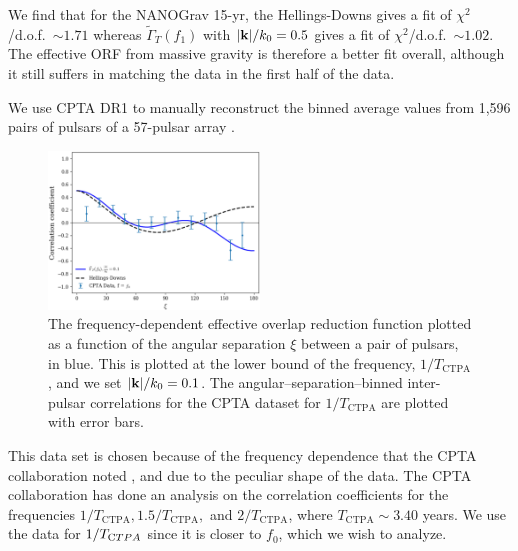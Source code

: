 \documentclass[prd,aps,psfig,nofootinbib,nobibnotes,superscriptaddress,preprintnumbers,times]{revtex4-2}\setlength{\topmargin}{-14mm}
\begin{document}
We find that for the NANOGrav 15-yr, the Hellings-Downs gives a fit of $\chi^2$/d.o.f.\ $\sim 1.71$ whereas $\tilde{\Gamma}_T(f_1)$ with $|{\bf k}|/k_0 = 0.5$ gives a fit of $\chi^2$/d.o.f.\ $\sim 1.02$. The effective ORF from massive gravity is therefore a better fit overall, although it still suffers in matching the data in the first half of the data.

We use CPTA DR1 to manually reconstruct the binned average values from 1,596 pairs of pulsars of a 57-pulsar array \cite{Xu:2023wog}. 
\begin{figure}[h]
    \centering
    \includegraphics[width=0.5\textwidth]{fig3.pdf}
    \caption{The frequency-dependent effective overlap reduction function plotted as a function of the angular separation $\xi$ between a pair of pulsars, in blue. This is plotted at the lower bound of the frequency, $1/T_{\text{CTPA}}$, and we set $|{\bf k}|/k_0 = 0.1$. The angular–separation–binned inter-pulsar correlations for the CPTA dataset for $1/T_{\text{CTPA}}$ are plotted with error bars.}
    \label{fig:cpta}
\end{figure}
This data set is chosen because of the frequency dependence that the CPTA collaboration noted \cite{Xu:2023wog}, and due to the peculiar shape of the data. The CPTA collaboration has done an analysis on the correlation coefficients for the frequencies $1/T_{\text{CTPA}}, 1.5/T_{\text{CTPA}},$ and $2/T_{\text{CTPA}}$, where $T_{\text{CTPA}} \sim 3.40$ years. We use the data for $1/T_{\text CTPA}$ since it is closer to $f_0$, which we wish to analyze. 
\end{document}
